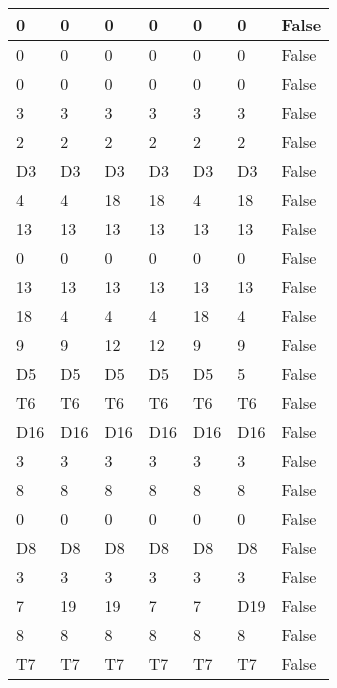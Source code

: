 \begin{longtable}[htbp]{| p{} | p{} | p{}| p{}| p{}| p{}| p{}|}
0 & 0 & 0 & 0 & 0 & 0 & False \\ \hline
0 & 0 & 0 & 0 & 0 & 0 & False \\ \hline
0 & 0 & 0 & 0 & 0 & 0 & False \\ \hline
3 & 3 & 3 & 3 & 3 & 3 & False \\ \hline
2 & 2 & 2 & 2 & 2 & 2 & False \\ \hline
\multicolumn{1}{|l|}{D3} & \multicolumn{1}{l|}{D3} & \multicolumn{1}{l|}{D3} & \multicolumn{1}{l|}{D3} & \multicolumn{1}{l|}{D3} & \multicolumn{1}{l|}{D3} & False \\ \hline
4 & 4 & 18 & 18 & 4 & 18 & False \\ \hline
13 & 13 & 13 & 13 & 13 & 13 & False \\ \hline
0 & 0 & 0 & 0 & 0 & 0 & False \\ \hline
13 & 13 & 13 & 13 & 13 & 13 & False \\ \hline
18 & 4 & 4 & 4 & 18 & 4 & False \\ \hline
9 & 9 & 12 & 12 & 9 & 9 & False \\ \hline
\multicolumn{1}{|l|}{D5} & \multicolumn{1}{l|}{D5} & \multicolumn{1}{l|}{D5} & \multicolumn{1}{l|}{D5} & \multicolumn{1}{l|}{D5} & 5 & False \\ \hline
\multicolumn{1}{|l|}{T6} & \multicolumn{1}{l|}{T6} & \multicolumn{1}{l|}{T6} & \multicolumn{1}{l|}{T6} & \multicolumn{1}{l|}{T6} & \multicolumn{1}{l|}{T6} & False \\ \hline
\multicolumn{1}{|l|}{D16} & \multicolumn{1}{l|}{D16} & \multicolumn{1}{l|}{D16} & \multicolumn{1}{l|}{D16} & \multicolumn{1}{l|}{D16} & \multicolumn{1}{l|}{D16} & False \\ \hline
3 & 3 & 3 & 3 & 3 & 3 & False \\ \hline
8 & 8 & 8 & 8 & 8 & 8 & False \\ \hline
0 & 0 & 0 & 0 & 0 & 0 & False \\ \hline
\multicolumn{1}{|l|}{D8} & \multicolumn{1}{l|}{D8} & \multicolumn{1}{l|}{D8} & \multicolumn{1}{l|}{D8} & \multicolumn{1}{l|}{D8} & \multicolumn{1}{l|}{D8} & False \\ \hline
3 & 3 & 3 & 3 & 3 & 3 & False \\ \hline
7 & 19 & 19 & 7 & 7 & \multicolumn{1}{l|}{D19} & False \\ \hline
8 & 8 & 8 & 8 & 8 & 8 & False \\ \hline
\multicolumn{1}{|l|}{T7} & \multicolumn{1}{l|}{T7} & \multicolumn{1}{l|}{T7} & \multicolumn{1}{l|}{T7} & \multicolumn{1}{l|}{T7} & \multicolumn{1}{l|}{T7} & False \\ \hline

\end{longtable}
